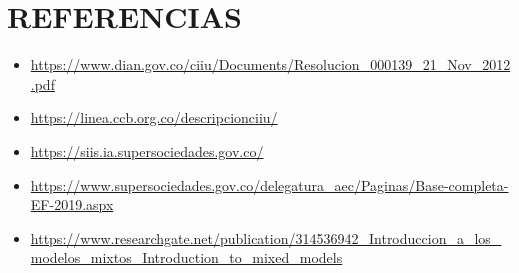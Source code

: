 \documentclass[
  11pt,
  a4paper,
]{book}
\begin{document}
\hypertarget{referencias}{%
\chapter{REFERENCIAS}\label{referencias}}

\begin{itemize}
\item
  \url{https://www.dian.gov.co/ciiu/Documents/Resolucion_000139_21_Nov_2012.pdf}
\item
  \url{https://linea.ccb.org.co/descripcionciiu/}
\item
  \url{https://siis.ia.supersociedades.gov.co/}
\item
  \url{https://www.supersociedades.gov.co/delegatura_aec/Paginas/Base-completa-EF-2019.aspx}
\item
  \url{https://www.researchgate.net/publication/314536942_Introduccion_a_los_modelos_mixtos_Introduction_to_mixed_models}
\end{itemize}

\backmatter
\end{document}
